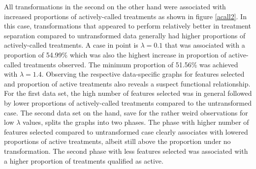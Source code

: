 \documentclass[11pt]{article}
\begin{document}
\par{All transformations in the second on the other hand were associated with increased proportions of actively-called treatments as shown in figure \ref{acall2}. In this case, transformations that appeared to perform relatively better in treatment separation compared to untransformed data generally had higher proportions of actively-called treatments. A case in point is $\lambda = 0.1$ that was associated with a proportion of 54.99\% which was also the highest increase in proportion of active-called treatments observed. The minimum proportion of 51.56\% was achieved with $\lambda = 1.4$. Observing the respective data-specific graphs for features selected and proportion of active treatments also reveals a suspect functional relationship. For the first data set, the high number of features selected was in general followed by lower proportions of actively-called treatments compared to the untransformed case. The second data set on the hand, save for the rather weird observations for low $\lambda $ values, splits the graphs into two phases. The phase with higher number of features selected compared to untransformed case clearly associates with lowered proportions of active treatments, albeit still above the proportion under no transformation. The second phase with less features selected was associated with a higher proportion of treatments qualified as active. }
\end{document}
